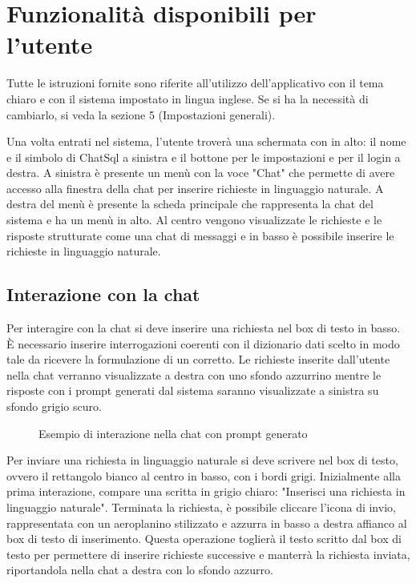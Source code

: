 \section{Funzionalità disponibili per l'utente}
\label{sec:sezUtente}

Tutte le istruzioni fornite sono riferite all'utilizzo dell'applicativo con il tema chiaro e con il sistema impostato in lingua inglese. Se si ha la necessità di cambiarlo, si veda la sezione 5 (Impostazioni generali).

Una volta entrati nel sistema, l'utente troverà una schermata con in alto: il nome e il simbolo di ChatSql a sinistra e il bottone per le impostazioni e per il login a destra. A sinistra è presente un menù con la voce "Chat" che permette di avere accesso alla finestra della chat per inserire richieste in linguaggio naturale. A destra del menù è presente la scheda principale che rappresenta la chat del sistema e ha un menù in alto. Al centro vengono visualizzate le richieste e le risposte strutturate come una chat di messaggi e in basso è possibile inserire le richieste in linguaggio naturale.

\subsection{Interazione con la chat}

Per interagire con la chat si deve inserire una richiesta nel box di testo in basso. È necessario inserire interrogazioni coerenti con il dizionario dati scelto in modo tale da ricevere la formulazione di un  corretto. Le richieste inserite dall'utente nella chat verranno visualizzate a destra con uno sfondo azzurrino mentre le risposte con i prompt generati dal sistema saranno visualizzate a sinistra su sfondo grigio scuro.

\begin{figure}[H]
  \centering
  \caption{Esempio di interazione nella chat con prompt generato}
\end{figure}

Per inviare una richiesta in linguaggio naturale si deve scrivere nel box di testo, ovvero il rettangolo bianco al centro in basso, con i bordi grigi. Inizialmente alla prima interazione, compare una scritta in grigio chiaro: "Inserisci una richiesta in linguaggio naturale". Terminata la richiesta, è possibile cliccare l'icona di invio, rappresentata con un aeroplanino stilizzato e azzurra in basso a destra affianco al box di testo di inserimento. Questa operazione toglierà il testo scritto dal box di testo per permettere di inserire richieste successive e manterrà la richiesta inviata, riportandola nella chat a destra con lo sfondo azzurro.

